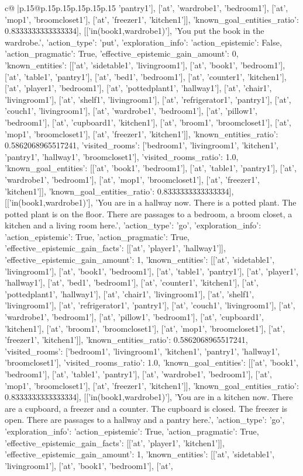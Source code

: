 \documentclass{article}
\begin{document}
{\begin{supertabular}{c@{$\;$}|p{.15\linewidth}@{}p{.15\linewidth}p{.15\linewidth}p{.15\linewidth}p{.15\linewidth}p{.15\linewidth}}
{{{'pantry1'], ['at', 'wardrobe1', 'bedroom1'], ['at', 'mop1', 'broomcloset1'], ['at', 'freezer1', 'kitchen1']], 'known_goal_entities_ratio': 0.8333333333333334}}], [['in(book1,wardrobe1)'], 'You put the book in the wardrobe.', {'action_type': 'put', 'exploration_info': {'action_epistemic': False, 'action_pragmatic': True, 'effective_epistemic_gain_amount': 0, 'known_entities': [['at', 'sidetable1', 'livingroom1'], ['at', 'book1', 'bedroom1'], ['at', 'table1', 'pantry1'], ['at', 'bed1', 'bedroom1'], ['at', 'counter1', 'kitchen1'], ['at', 'player1', 'bedroom1'], ['at', 'pottedplant1', 'hallway1'], ['at', 'chair1', 'livingroom1'], ['at', 'shelf1', 'livingroom1'], ['at', 'refrigerator1', 'pantry1'], ['at', 'couch1', 'livingroom1'], ['at', 'wardrobe1', 'bedroom1'], ['at', 'pillow1', 'bedroom1'], ['at', 'cupboard1', 'kitchen1'], ['at', 'broom1', 'broomcloset1'], ['at', 'mop1', 'broomcloset1'], ['at', 'freezer1', 'kitchen1']], 'known_entities_ratio': 0.5862068965517241, 'visited_rooms': ['bedroom1', 'livingroom1', 'kitchen1', 'pantry1', 'hallway1', 'broomcloset1'], 'visited_rooms_ratio': 1.0, 'known_goal_entities': [['at', 'book1', 'bedroom1'], ['at', 'table1', 'pantry1'], ['at', 'wardrobe1', 'bedroom1'], ['at', 'mop1', 'broomcloset1'], ['at', 'freezer1', 'kitchen1']], 'known_goal_entities_ratio': 0.8333333333333334}}], [['in(book1,wardrobe1)'], 'You are in a hallway now. There is a potted plant. The potted plant is on the floor. There are passages to a bedroom, a broom closet, a kitchen and a living room here.', {'action_type': 'go', 'exploration_info': {'action_epistemic': True, 'action_pragmatic': True, 'effective_epistemic_gain_facts': [['at', 'player1', 'hallway1']], 'effective_epistemic_gain_amount': 1, 'known_entities': [['at', 'sidetable1', 'livingroom1'], ['at', 'book1', 'bedroom1'], ['at', 'table1', 'pantry1'], ['at', 'player1', 'hallway1'], ['at', 'bed1', 'bedroom1'], ['at', 'counter1', 'kitchen1'], ['at', 'pottedplant1', 'hallway1'], ['at', 'chair1', 'livingroom1'], ['at', 'shelf1', 'livingroom1'], ['at', 'refrigerator1', 'pantry1'], ['at', 'couch1', 'livingroom1'], ['at', 'wardrobe1', 'bedroom1'], ['at', 'pillow1', 'bedroom1'], ['at', 'cupboard1', 'kitchen1'], ['at', 'broom1', 'broomcloset1'], ['at', 'mop1', 'broomcloset1'], ['at', 'freezer1', 'kitchen1']], 'known_entities_ratio': 0.5862068965517241, 'visited_rooms': ['bedroom1', 'livingroom1', 'kitchen1', 'pantry1', 'hallway1', 'broomcloset1'], 'visited_rooms_ratio': 1.0, 'known_goal_entities': [['at', 'book1', 'bedroom1'], ['at', 'table1', 'pantry1'], ['at', 'wardrobe1', 'bedroom1'], ['at', 'mop1', 'broomcloset1'], ['at', 'freezer1', 'kitchen1']], 'known_goal_entities_ratio': 0.8333333333333334}}], [['in(book1,wardrobe1)'], 'You are in a kitchen now. There are a cupboard, a freezer and a counter. The cupboard is closed. The freezer is open. There are passages to a hallway and a pantry here.', {'action_type': 'go', 'exploration_info': {'action_epistemic': True, 'action_pragmatic': True, 'effective_epistemic_gain_facts': [['at', 'player1', 'kitchen1']], 'effective_epistemic_gain_amount': 1, 'known_entities': [['at', 'sidetable1', 'livingroom1'], ['at', 'book1', 'bedroom1'], ['at', }}}
\end{supertabular}}
\end{document}
